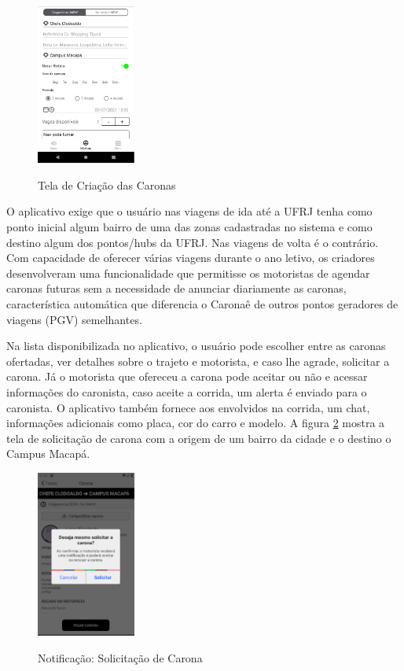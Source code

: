 \begin{figure}[!hbtp]
	\centering
	\caption{Tela de Criação das Caronas}
	\includegraphics[width=0.29\textwidth]{./04-figuras/caronae/criacao_da_carona_carona_ufrj.png}
	\label{fig:publicar_carona}
\end{figure}

O aplicativo exige que o usuário nas viagens de ida até a UFRJ tenha como ponto inicial algum bairro de uma das zonas cadastradas no sistema e como destino algum dos pontos/hubs da UFRJ. Nas viagens de volta é o contrário. Com capacidade de oferecer várias viagens durante o ano letivo, os criadores desenvolveram uma funcionalidade que permitisse os motoristas de agendar caronas futuras sem a necessidade de anunciar diariamente as caronas, característica automática que diferencia o Caronaê de outros pontos geradores de viagens (PGV) semelhantes.

Na lista disponibilizada no aplicativo, o usuário pode escolher entre as caronas ofertadas, ver detalhes sobre o trajeto e motorista, e caso lhe agrade, solicitar a carona. Já o motorista que ofereceu a carona pode aceitar ou não e acessar informações do caronista, caso aceite a corrida, um alerta é enviado para o caronista. O aplicativo também fornece aos envolvidos na corrida, um chat, informações adicionais como placa, cor do carro e modelo. A figura \ref{fig:solicitacao_de_carona} mostra a tela de solicitação de carona com a origem de um bairro da cidade e o destino o Campus Macapá.

\begin{figure}[!hbtp]
	\centering
	\caption{Notificação: Solicitação de Carona}
	\includegraphics[width=0.29\textwidth]{./04-figuras/caronae/tela_solicitacao_de_carona_2.png}
	\label{fig:solicitacao_de_carona}
\end{figure}

